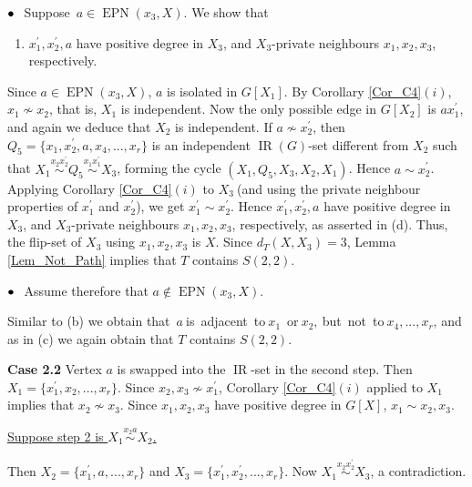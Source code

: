 \documentclass[12pt]{article}%
\begin{document}
$\bullet\hspace{0.1in}$Suppose $\,a\in\operatorname{EPN}(x_{3},X)$. We show that

\begin{enumerate}
\item[(d)] $x_{1}^{\prime},x_{2}^{\prime},a$ have positive degree in $X_{3}$,
and $X_{3}$-private neighbours $x_{1},x_{2},x_{3}$, respectively.
\end{enumerate}

Since $a\in\operatorname{EPN}(x_{3},X)$, $a$ is isolated in $G[X_{1}]$. By
Corollary \ref{Cor_C4}$(i)$, $x_{1}\nsim x_{2}$, that is, $X_{1}$ is
independent. Now the only possible edge in $G[X_{2}]$ is $ax_{1}^{\prime}$,
and again we deduce that $X_{2}$ is independent. If $a\nsim x_{2}^{\prime}$,
then $Q_{5}=\{x_{1},x_{2}^{\prime},a,x_{4},...,x_{r}\}$ is an independent
$\operatorname{IR}(G)$-set different from $X_{2}$ such that $X_{1}%
\overset{x_{2}x_{2}^{\prime}}{\sim}Q_{5}\overset{x_{1}x_{1}^{\prime}}{\sim
}X_{3}$, forming the cycle $(X_{1},Q_{5},X_{3},X_{2},X_{1})$. Hence $a\sim
x_{2}^{\prime}$. Applying Corollary \ref{Cor_C4}$(i)$ to $X_{3}\ $(and using
the private neighbour properties of $x_{1}^{\prime}$ and $x_{2}^{\prime}$), we
get $x_{1}^{\prime}\sim x_{2}^{\prime}$. Hence $x_{1}^{\prime},x_{2}^{\prime
},a$ have positive degree in $X_{3}$, and $X_{3}$-private neighbours
$x_{1},x_{2},x_{3}$, respectively, as asserted in (d). Thus, the flip-set of
$X_{3}$ using $x_{1},x_{2},x_{3}$ is $X$. Since $d_{T}(X,X_{3})=3$, Lemma
\ref{Lem_Not_Path} implies that $T$ contains $S(2,2)$.

$\bullet\hspace{0.1in}$Assume therefore that $a\notin\operatorname{EPN}%
(x_{3},X)$.

Similar to (b) we obtain that\ $a\ $is\ adjacent\ to$\ x_{1}$\ or$\ x_{2}%
,\ $but\ not\ to$\ x_{4},...,x_{r}$, and as in (c) we again obtain that $T$
contains $S(2,2)$. \medskip

\noindent\textbf{Case 2.2\hspace{0.1in} }Vertex $a$ is swapped into the
$\operatorname{IR}$-set in the second step. Then $X_{1}=\{x_{1}^{\prime}%
,x_{2},...,x_{r}\}$. Since $x_{2},x_{3}\nsim x_{1}^{\prime}$, Corollary
\ref{Cor_C4}$(i)$ applied to $X_{1}$ implies that $x_{2}\nsim x_{3}$. Since
$x_{1},x_{2},x_{3}$ have positive degree in $G[X]$, $x_{1}\sim x_{2},x_{3}$.

\noindent\underline{Suppose step 2 is $X_{1}\overset{x_{2}a}{\sim}X_{2}$.}

\noindent Then $X_{2}=\{x_{1}^{\prime},a,...,x_{r}\}$ and $X_{3}%
=\{x_{1}^{\prime},x_{2}^{\prime},...,x_{r}\}$. Now $X_{1}\overset{x_{2}%
x_{2}^{\prime}}{\sim}X_{3}$, a contradiction.
\end{document}

